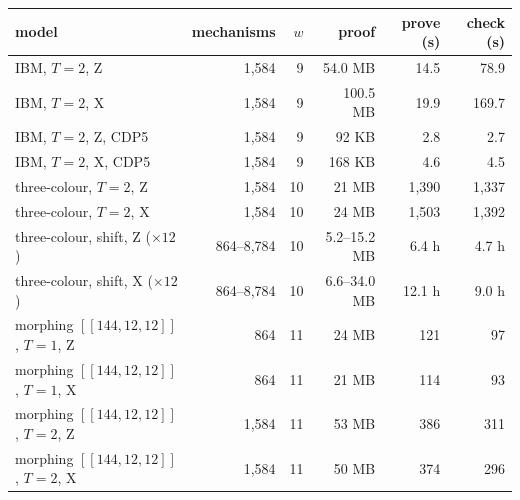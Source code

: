 \begin{tabular}{@{}lrrrrr@{}}
\toprule
model & mechanisms & $w$ & proof & prove (s) & check (s) \\
\midrule
IBM, $T=2$, Z & 1{,}584 & 9 & 54.0 MB & 14.5 & 78.9 \\
IBM, $T=2$, X & 1{,}584 & 9 & 100.5 MB & 19.9 & 169.7 \\
IBM, $T=2$, Z, CDP5 & 1{,}584 & 9 & 92 KB & 2.8 & 2.7 \\
IBM, $T=2$, X, CDP5 & 1{,}584 & 9 & 168 KB & 4.6 & 4.5 \\
three-colour, $T=2$, Z & 1{,}584 & 10 & 21 MB & 1{,}390 & 1{,}337 \\
three-colour, $T=2$, X & 1{,}584 & 10 & 24 MB & 1{,}503 & 1{,}392 \\
three-colour, shift, Z ($\times 12$) & 864--8{,}784 & 10 & 5.2--15.2 MB & 6.4 h & 4.7 h \\
three-colour, shift, X ($\times 12$) & 864--8{,}784 & 10 & 6.6--34.0 MB & 12.1 h & 9.0 h \\
morphing $[[144,12,12]]$, $T=1$, Z & 864 & 11 & 24 MB & 121 & 97 \\
morphing $[[144,12,12]]$, $T=1$, X & 864 & 11 & 21 MB & 114 & 93 \\
morphing $[[144,12,12]]$, $T=2$, Z & 1{,}584 & 11 & 53 MB & 386 & 311 \\
morphing $[[144,12,12]]$, $T=2$, X & 1{,}584 & 11 & 50 MB & 374 & 296 \\
\bottomrule
\end{tabular}
